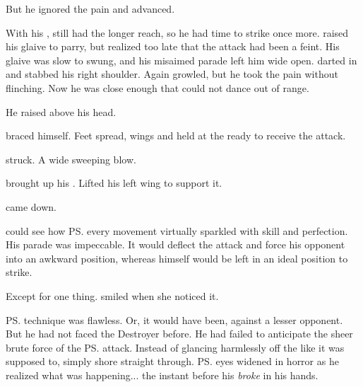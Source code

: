 But he ignored the pain and advanced. 

With his \senaan, \Teshrial{} still had the longer reach, so he had time to strike once more. 
\Ishnaruchaefir{} raised his glaive to parry, but realized too late that the attack had been a feint. 
His glaive was slow to swung, and his misaimed parade left him wide open. \Teshrial{} darted in and stabbed his right shoulder. 
Again \Ishnaruchaefir{} growled, but he took the pain without flinching. 
Now he was close enough that \Teshrial{} could not dance out of \melee{} range. 

He raised \Rystessakhin{} above his head. 

\Teshrial{} braced himself. 
Feet spread, wings and \senaan{} held at the ready to receive the attack. 

\Ishnaruchaefir{} struck. 
A wide sweeping blow. 

\Teshrial{} brought up his \senaan. 
Lifted his left wing to support it. 

\Rystessakhin{} came down. 

\Criseis{} could see how \ps{\Teshrial} every movement virtually sparkled with skill and perfection. 
His parade was impeccable. 
It would deflect the attack and force his opponent into an awkward position, whereas \Teshrial{} himself would be left in an ideal position to strike. 

Except for one thing. 
\Criseis{} smiled when she noticed it. 

%   
%   

\ps{\Teshrial} technique was flawless. 
Or, it would have been, against a lesser opponent. 
But he had not faced the Destroyer before. 
He had failed to anticipate the sheer brute force of the \ps{\dragonlord} attack. 
Instead of glancing harmlessly off the \senaan{} like it was supposed to, \Rystessakhin{} simply shore straight through. 
\ps{\Teshrial} eyes widened in horror as he realized what was happening... the instant before his \senaan{} \emph{broke} in his hands. 

